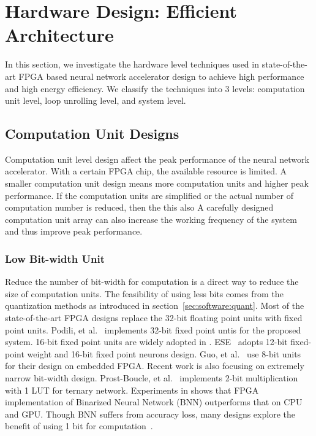 \section{Hardware Design: Efficient Architecture}\label{sec:hardware}

In this section, we investigate the hardware level techniques used in state-of-the-art FPGA based neural network accelerator design to achieve high performance and high energy efficiency. We classify the techniques into 3 levels: computation unit level, loop unrolling level, and system level.

\subsection{Computation Unit Designs}\label{sec:hardware:cu}

Computation unit level design affect the peak performance of the neural network accelerator. With a certain FPGA chip, the available resource is limited. A smaller computation unit design means more computation units and higher peak performance. If the computation units are simplified or the actual number of computation number is reduced, then the  this also A carefully designed computation unit array can also increase the working frequency of the system and thus improve peak performance.

\subsubsection{Low Bit-width Unit}\label{sec:hardware:cu:lbu}
Reduce the number of bit-width for computation is a direct way to reduce the size of computation units. The feasibility of using less bits comes from the quantization methods as introduced in section~\ref{sec:software:quant}. Most of the state-of-the-art FPGA designs replace the 32-bit floating point units with fixed point units. Podili, et al.~\cite{podili2017fast} implements 32-bit fixed point untis for the proposed system. 16-bit fixed point units are widely adopted in \cite{qiu2016going, li2016high, xiao2017exploring, guan2017fp, zhang2016caffeine}. ESE~\cite{han2017ese} adopts 12-bit fixed-point weight and 16-bit fixed point neurons design. Guo, et al.~\cite{guo2017angel} use 8-bit units for their design on embedded FPGA. Recent work is also focusing on extremely narrow bit-width design. Prost-Boucle, et al.~\cite{prost2017scalable} implements 2-bit multiplication with 1 LUT for ternary network. Experiments in \cite{nurvitadhi2016accelerating} shows that FPGA implementation of Binarized Neural Network (BNN) outperforms that on CPU and GPU. Though BNN suffers from accuracy loss, many designs explore the benefit of using 1 bit for computation~\cite{li20177, nakahara2017batch, zhao2017accelerating, umuroglu2017finn, nakahara2017fully, jiao2017accelerating, moss2017high}.

